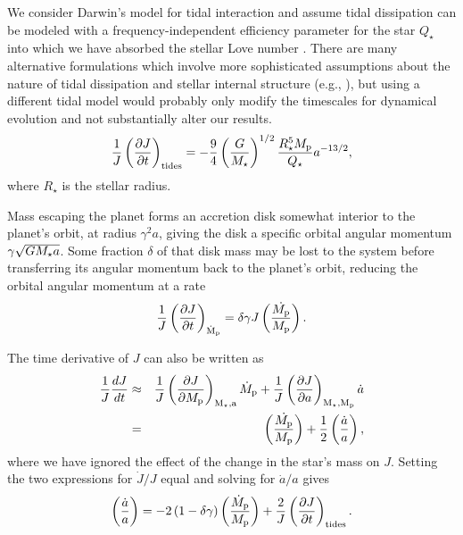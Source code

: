 \documentclass{svjour3}                     %
\begin{document}
We consider Darwin's model for tidal interaction and assume tidal dissipation can be modeled with a frequency-independent efficiency parameter for the star $Q_{\star}$ into which we have absorbed the stellar Love number \cite{Jackson2008Tidal}. There are many alternative formulations which involve more sophisticated assumptions about the nature of tidal dissipation and stellar internal structure (e.g., \cite{Essick2015Orbital}), but using a different tidal model would probably only modify the timescales for dynamical evolution and not substantially alter our results. 
\begin{equation}
\frac{1}{J}\left(\frac{\partial J}{\partial t}\right)_{\rm tides} = -\frac{9}{4} \left( \frac{G}{M_{\star}} \right)^{1/2} \frac{R_{\star}^5 M_{\rm p}}{Q_{\star}} a^{-13/2},
\label{eqn:tidal_decay}
\end{equation}
where $R_{\star}$ is the stellar radius.

Mass escaping the planet forms an accretion disk somewhat interior to the planet's orbit, at radius $\gamma^2 a$, giving the disk a specific orbital angular momentum $\gamma \sqrt{G M_{\rm \star} a}$. Some fraction $\delta$ of that disk mass may be lost to the system before transferring its angular momentum back to the planet's orbit, reducing the orbital angular momentum at a rate
\begin{equation}
\frac{1}{J}\left(\frac{\partial J}{\partial t}\right)_{\rm \dot{M}_{\rm p}} = \delta \gamma J \left( \frac{\dot{M_{\rm p}}}{M_{\rm p}} \right).
\label{eqn:loss_of_angular_momentum_from_system}
\end{equation}

The time derivative of $J$ can also be written as 
\begin{eqnarray}
\frac{1}{J}\frac{dJ}{dt} & \approx & \frac{1}{J} \left(\frac{\partial J}{\partial M_{\rm p}}\right)_{\rm M_{\rm \star}, a} \dot{M}_{\rm p} + \frac{1}{J} \left(\frac{\partial J}{\partial a}\right)_{\rm M_{\rm \star}, M_{\rm p}} \dot{a} \nonumber \\
& = & \left( \frac{\dot{M_{\rm p}}}{M_{\rm p}} \right) + \frac{1}{2} \left( \frac{\dot{a}}{a} \right),
\label{eqn:change_in_angular_momentum}
\end{eqnarray}
where we have ignored the effect of the change in the star's mass on $J$. Setting the two expressions for $\dot{J}/J$ equal and solving for $\dot{a}/a$ gives
\begin{equation}
\left(\frac{\dot{a}}{a}\right) = -2 \left(1 - \delta \gamma \right) \left( \frac{\dot{M}_{\rm p}}{M_{\rm p}}\right) + \frac{2}{J} \left( \frac{\partial J}{\partial t}\right)_{\rm tides}.
\label{eqn:initial_dadt}
\end{equation}
\end{document}
